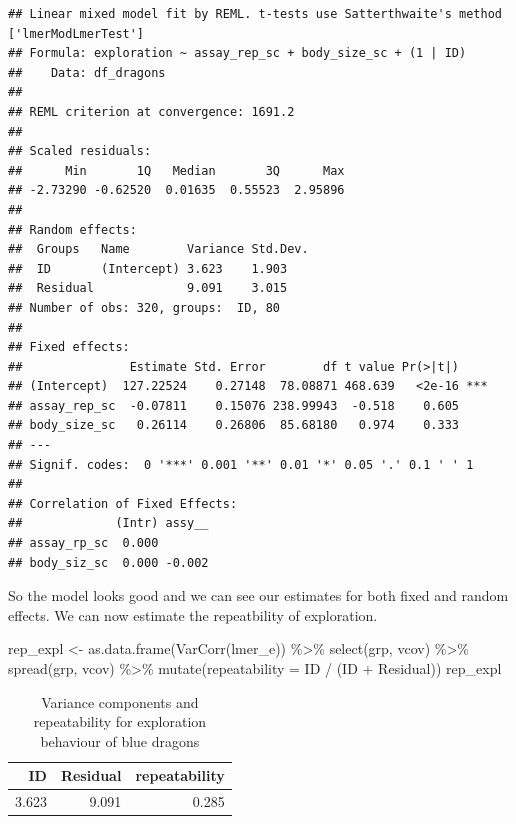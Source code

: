 \documentclass[
  12pt,
]{book}
\newenvironment{Shaded}{\begin{snugshade}}{\end{snugshade}}
\newcommand{\AttributeTok}[1]{\textcolor[rgb]{0.77,0.63,0.00}{#1}}
\newcommand{\FunctionTok}[1]{\textcolor[rgb]{0.00,0.00,0.00}{#1}}
\newcommand{\NormalTok}[1]{#1}
\newcommand{\OtherTok}[1]{\textcolor[rgb]{0.56,0.35,0.01}{#1}}
\newcommand{\SpecialCharTok}[1]{\textcolor[rgb]{0.00,0.00,0.00}{#1}}
\begin{document}
\begin{verbatim}
## Linear mixed model fit by REML. t-tests use Satterthwaite's method ['lmerModLmerTest']
## Formula: exploration ~ assay_rep_sc + body_size_sc + (1 | ID)
##    Data: df_dragons
## 
## REML criterion at convergence: 1691.2
## 
## Scaled residuals: 
##      Min       1Q   Median       3Q      Max 
## -2.73290 -0.62520  0.01635  0.55523  2.95896 
## 
## Random effects:
##  Groups   Name        Variance Std.Dev.
##  ID       (Intercept) 3.623    1.903   
##  Residual             9.091    3.015   
## Number of obs: 320, groups:  ID, 80
## 
## Fixed effects:
##               Estimate Std. Error        df t value Pr(>|t|)    
## (Intercept)  127.22524    0.27148  78.08871 468.639   <2e-16 ***
## assay_rep_sc  -0.07811    0.15076 238.99943  -0.518    0.605    
## body_size_sc   0.26114    0.26806  85.68180   0.974    0.333    
## ---
## Signif. codes:  0 '***' 0.001 '**' 0.01 '*' 0.05 '.' 0.1 ' ' 1
## 
## Correlation of Fixed Effects:
##             (Intr) assy__
## assay_rp_sc  0.000       
## body_siz_sc  0.000 -0.002
\end{verbatim}

So the model looks good and we can see our estimates for both fixed and random effects. We can now estimate the repeatbility of exploration.

\begin{Shaded}
\begin{Highlighting}[]
\NormalTok{rep\_expl }\OtherTok{\textless{}{-}} \FunctionTok{as.data.frame}\NormalTok{(}\FunctionTok{VarCorr}\NormalTok{(lmer\_e)) }\SpecialCharTok{\%\textgreater{}\%}
  \FunctionTok{select}\NormalTok{(grp, vcov) }\SpecialCharTok{\%\textgreater{}\%}
  \FunctionTok{spread}\NormalTok{(grp, vcov) }\SpecialCharTok{\%\textgreater{}\%}
  \FunctionTok{mutate}\NormalTok{(}\AttributeTok{repeatability =}\NormalTok{ ID }\SpecialCharTok{/}\NormalTok{ (ID }\SpecialCharTok{+}\NormalTok{ Residual))}
\NormalTok{rep\_expl}
\end{Highlighting}
\end{Shaded}

\begin{table}

\caption{\label{tab:unnamed-chunk-99}Variance components and repeatability for exploration
   behaviour of blue dragons}
\centering
\begin{tabular}[t]{r|r|r}
\hline
ID & Residual & repeatability\\
\hline
3.623 & 9.091 & 0.285\\
\hline
\end{tabular}
\end{table}
\end{document}
